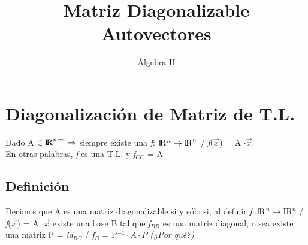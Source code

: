 \documentclass[11pt]{article}
\title{Matriz Diagonalizable \\Autovectores}
\author{Álgebra II}
\date{\vspace{-5ex}}
\begin{document}
\maketitle{}
\section{Diagonalización de Matriz de T.L.}
Dado A $\in {\rm I\!R}^{nxn} \Rightarrow$ siempre existe una \textit{f}: ${\rm I\!R}$$^{n}\rightarrow {\rm I\!R}^{n}$ / \textit{f}($\vec{x}$) = A $\cdot \vec{x}$. \\
En otras palabras, \textit{f} es una T.L. y \textbardbl \textit{f}\textbardbl $_{CC}$ = A
\subsection{Definición}
Decimos que A es una matriz diagonalizable si y sólo si, al definir \textit{f}: ${\rm I\!R}$$^{n}\rightarrow ${\rm I\!R}$^{n}$ / \textit{f}($\vec{x}$) = A $\cdot \vec{x}$ existe una base B tal que \textbardbl \textit{f}\textbardbl $_{BB}$ es una matriz diagonal, o sea existe una matriz P = \textbardbl \textit{id}\textbardbl $_{BC}$ / \textbardbl \textit{f}\textbardbl $_{B}$ = P$^{-1}\cdot A \cdot P$ \textit{(¿Por qué?)}
\end{document}
